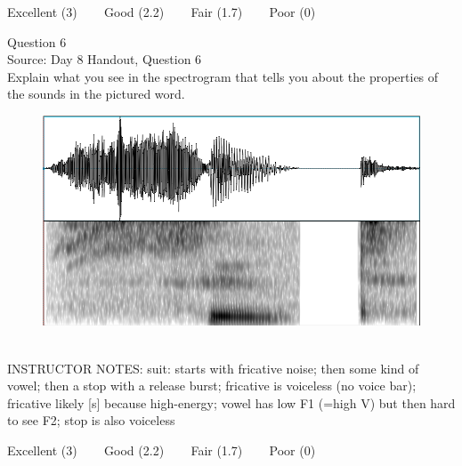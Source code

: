 \documentclass[12pt]{article}
\begin{document}
\vfill
Excellent (3) ~~~ Good (2.2) ~~~ Fair (1.7) ~~~ Poor (0)
\newpage

{\large Question 6}\\

Source: Day 8 Handout, Question 6\\

Explain what you see in the spectrogram that tells you about the properties of the sounds in the pictured word.\\

\begin{figure}[H]
\includegraphics{../images/spectrogram_suit.png}
\end{figure}

~\\
INSTRUCTOR NOTES: suit: starts with fricative noise; then some kind of vowel; then a stop with a release burst; fricative is voiceless (no voice bar); fricative likely [s] because high-energy; vowel has low F1 (=high V) but then hard to see F2; stop is also voiceless


\vfill
Excellent (3) ~~~ Good (2.2) ~~~ Fair (1.7) ~~~ Poor (0)
\newpage

\begin{center}
\textbf{{\color{red}{\HUGE END OF EXAM}}}\\

\end{center}
\newpage

\begin{center}
\textbf{{\color{blue}{\HUGE START OF EXAM\\}}}

\textbf{{\color{blue}{\HUGE Student ID: 2931\\}}}

\textbf{{\color{blue}{\HUGE 2:40 - 3:00 PM\\}}}

\end{center}
\newpage
\end{document}
